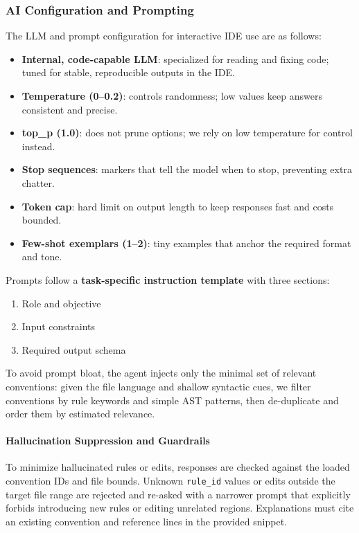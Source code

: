 \begin{spacing}{1.2}
\subsubsection{AI Configuration and Prompting}
The LLM and prompt configuration for interactive IDE use are as follows:
 
\begin{itemize}
    \item \textbf{Internal, code-capable LLM}: specialized for reading and fixing code; tuned for stable, reproducible outputs in the IDE.
    \item \textbf{Temperature (0--0.2)}: controls randomness; low values keep answers consistent and precise.
    \item \textbf{top\_p (1.0)}: does not prune options; we rely on low temperature for control instead.
    \item \textbf{Stop sequences}: markers that tell the model when to stop, preventing extra chatter.
    \item \textbf{Token cap}: hard limit on output length to keep responses fast and costs bounded.
    \item \textbf{Few-shot exemplars (1--2)}: tiny examples that anchor the required format and tone.
\end{itemize}

Prompts follow a \textbf{task-specific instruction template} with three sections:
\begin{enumerate}
    \item Role and objective
    \item Input constraints
    \item Required output schema
\end{enumerate}
To avoid prompt bloat, the agent injects only the minimal set of relevant conventions: given the file language and shallow syntactic cues, we filter conventions by rule keywords and simple AST patterns, then de-duplicate and order them by estimated relevance.

\paragraph{Hallucination Suppression and Guardrails}
To minimize hallucinated rules or edits, responses are checked against the loaded convention IDs and file bounds. Unknown \texttt{rule\_id} values or edits outside the target file range are rejected and re-asked with a narrower prompt that explicitly forbids introducing new rules or editing unrelated regions. Explanations must cite an existing convention and reference lines in the provided snippet.


\end{spacing}
